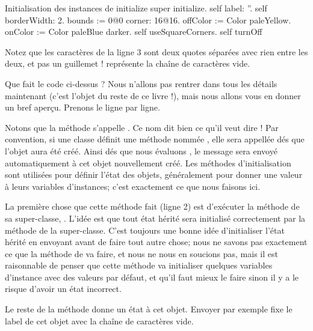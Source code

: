 \documentclass[a4paper,10pt,twoside]{book}
\begin{document}
\begin{numMethod}[scbecellinitialize]{Initialisation des instances de }
initialize
   super initialize.
   self label: ''.
   self borderWidth: 2.
   bounds := 0@0 corner: 16@16.
   offColor := Color paleYellow.
   onColor := Color paleBlue darker.
   self useSquareCorners.
   self turnOff
\end{numMethod}

\noindent
Notez que les caractères  de la ligne 3 sont deux quotes séparées avec rien entre les deux, et pas un guillemet !  représente la chaîne de caractères vide.


Que fait le code ci-dessus ?  Nous n'allons pas rentrer dans tous les détails maintenant (c'est l'objet du reste de ce livre !), mais nous allons vous en donner un bref aperçu. Prenons le ligne par ligne.

Notons que la méthode s'appelle .
Ce nom dit bien ce qu'il veut dire !
Par convention, si une classe définit une méthode nommée , elle sera appellée dés que l'objet aura été créé.
Ainsi dés que nous évaluons , le message  sera envoyé automatiquement à cet objet nouvellement créé.
Les méthodes d'initialisation sont utilisées pour définir l'état des objets, généralement pour donner une valeur à leurs variables d'instances; c'est exactement ce que nous faisons ici.

La première chose que cette méthode fait (ligne 2) est d'exécuter la méthode  de sa super-classe, .
L'idée est que tout état hérité sera initialisé correctement par la méthode  de la super-classe.
C'est toujours une bonne idée d'initialiser l'état hérité en envoyant  avant de faire tout autre chose; nous ne savons pas exactement ce que la méthode  de  va faire, et nous ne nous en soucions pas, mais il est raisonnable de penser que cette méthode va initialiser quelques variables d'instance avec des valeurs par défaut, et qu'il faut mieux le faire sinon il y a le risque d'avoir un état incorrect.

Le reste de la méthode donne un état à cet objet.
Envoyer  par exemple fixe le label de cet objet avec la chaîne de caractères vide.
\end{document}
